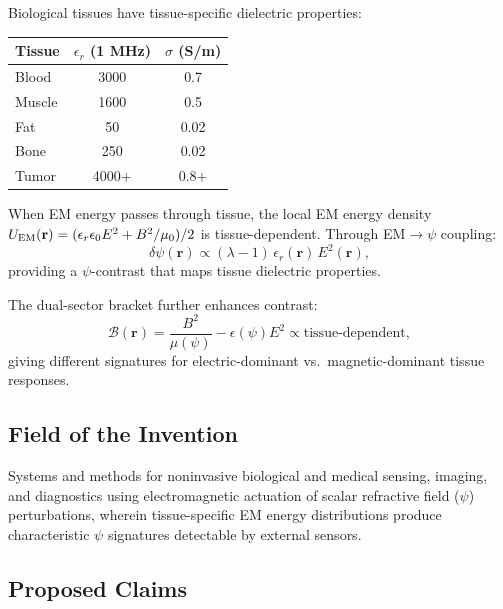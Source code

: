 \documentclass[12pt,letterpaper]{article}
\begin{document}
Biological tissues have tissue-specific dielectric properties:
\begin{center}
\begin{tabular}{lcc}
\toprule
Tissue & $\epsilon_r$ (1 MHz) & $\sigma$ (S/m) \\
\midrule
Blood & 3000 & 0.7 \\
Muscle & 1600 & 0.5 \\
Fat & 50 & 0.02 \\
Bone & 250 & 0.02 \\
Tumor & 4000+ & 0.8+ \\
\bottomrule
\end{tabular}
\end{center}

When EM energy passes through tissue, the local EM energy density
$U_{\rm EM}(\mathbf{r}) = (\epsilon_r\epsilon_0 E^2 + B^2/\mu_0)/2$
is tissue-dependent. Through EM$\to\psi$ coupling:
\[
\delta\psi(\mathbf{r}) \propto (\lambda-1)\,\epsilon_r(\mathbf{r})\,E^2(\mathbf{r}),
\]
providing a $\psi$-contrast that maps tissue dielectric properties.

The dual-sector bracket further enhances contrast:
\[
\mathcal{B}(\mathbf{r}) = \frac{B^2}{\mu(\psi)} - \epsilon(\psi)E^2
\propto \text{tissue-dependent},
\]
giving different signatures for electric-dominant vs.\ magnetic-dominant
tissue responses.

\subsection{Field of the Invention}

Systems and methods for noninvasive biological and medical sensing,
imaging, and diagnostics using electromagnetic actuation of scalar
refractive field ($\psi$) perturbations, wherein tissue-specific
EM energy distributions produce characteristic $\psi$ signatures
detectable by external sensors.

\subsection{Proposed Claims}
\end{document}
